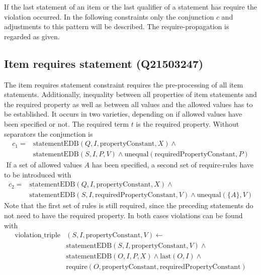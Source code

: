 \documentclass[hyperref,bachelorofscience,fleqn]{cgvpub}
\begin{document}
If the last statement of an item or the last qualifier of a statement has require the violation occurred. In the following constraints only the conjunction \(c\) and adjustments to this pattern will be described. The require-propagation is regarded as given.

\subsection{Item requires statement (Q21503247)}
The item requires statement constraint requires the pre-processing of all item statements. Additionally, inequality between all properties of item statements and the required property as well as between all values and the allowed values has to be established. It occurs in two varieties, depending on if allowed values have been specified or not. The required term \(t\) is the  required property. Without separators the conjunction is
\begin{equation*}
\begin{split}
c_1 = &\text{statementEDB}(Q, I, \text{propertyConstant}, X) \wedge{} \\
&\text{statementEDB}(S, I, P, V) \wedge \text{unequal}(\text{requiredPropertyConstant}, P)
\end{split}
\end{equation*} \(\)
If a set of allowed values \(A\) has been specified, a second set of require-rules have to be introduced with
\begin{equation*}
\begin{split}
c_2 = &\text{statementEDB}(Q, I, \text{propertyConstant}, X) \wedge{} \\
&\text{statementEDB}(S, I, \text{requiredPropertyConstant}, V) \wedge \text{unequal}(\{A\}, V)
\end{split}
\end{equation*}
Note that the first set of rules is still required, since the preceding statements do not need to have the required property. In both cases violations can be found with
\begin{equation*}
\begin{split}
\text{violation\_triple}&(S, I, \text{propertyConstant}, V) \leftarrow \\
&\text{statementEDB}(S, I, \text{propertyConstant}, V) \wedge{} \\
&\text{statementEDB}(O, I, P, X) \wedge \text{last}(O, I) \wedge{} \\
&\text{require}(O, \text{propertyConstant}, \text{requiredPropertyConstant})
\end{split}
\end{equation*}
\end{document}
